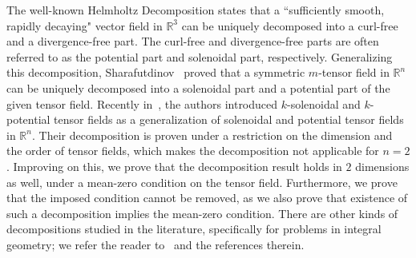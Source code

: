\documentclass[11pt]{article}
\newcommand{\Rb}{\mathbb{R}}
\begin{document}
The well-known Helmholtz Decomposition states that a ``sufficiently smooth, rapidly decaying" vector field in $\mathbb{R}^3$ can be uniquely decomposed into a curl-free and a divergence-free part. The curl-free and divergence-free parts are often referred to as the potential part and solenoidal part, respectively. Generalizing this decomposition, Sharafutdinov~\cite{Sharafutdinov_book} proved that a symmetric $m$-tensor field in $\Rb^n$ can be uniquely decomposed into a solenoidal part and a potential part of the given tensor field. Recently in~\cite{Rohit_Suman}, the authors introduced $k$-solenoidal and $k$-potential tensor fields as a generalization of solenoidal and potential tensor fields in $\Rb^n$.
Their decomposition is proven under a restriction on the dimension and the order of tensor fields, which makes the decomposition not applicable for $n=2$. Improving on this, we prove that the decomposition result holds in $2$ dimensions as well, under a mean-zero condition on the tensor field. Furthermore, we prove that the imposed condition cannot be removed, as we also prove that existence of such a decomposition implies the mean-zero condition. There are other kinds of decompositions studied in the literature, specifically for problems in integral geometry; we refer the reader to~\cite{derevtsov3, Polyakova_Svetov_normal_Radon_numerical, ilmavirta2025elasticraytransform} and the references therein. 
\end{document}
